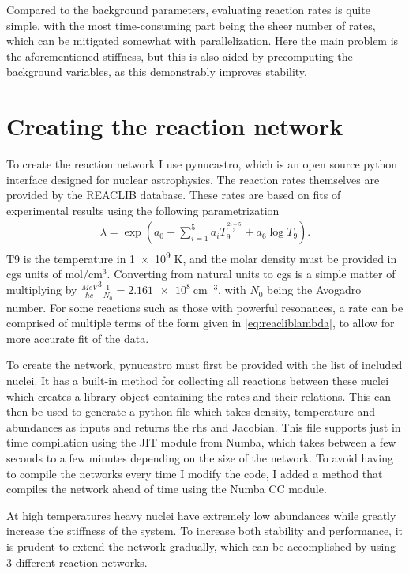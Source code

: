 Compared to the background parameters, evaluating reaction rates is quite simple, with the most time-consuming part being the sheer number of rates, which can be mitigated somewhat with parallelization. Here the main problem is the aforementioned stiffness, but this is also aided by precomputing the background variables, as this demonstrably improves stability. 




\section{Creating the reaction network}
\label{sec:pna}
To create the reaction network I use pynucastro\cite{pynucastro2}, which is an open source python interface designed for nuclear astrophysics. The reaction rates themselves are provided by the REACLIB database\cite{REACLIB}. These rates are based on fits of experimental results using the following parametrization 
\begin{align}
    \lambda = \exp\left(a_0+\sum_{i=1}^{5}a_i T_9^{\frac{2i-5}{3}}+a_6 \log{T_9}\right).
    \label{eq:reacliblambda}
\end{align}
T9 is the temperature in \num{1e9} K, and the molar density must be provided in cgs units of $\text{mol}/\text{cm}^3$. Converting from natural units to cgs is a simple matter of multiplying by $\frac{MeV}{\hbar c}^3\frac{1}{N_0}=\SI{2.161e8}{\cm^{-3}}$, with $N_0$ being the Avogadro number. For some reactions such as those with powerful resonances, a rate can be comprised of multiple terms of the form given in \eqref{eq:reacliblambda}, to allow for more accurate fit of the data. 

To create the network, pynucastro must first be provided with the list of included nuclei. It has a built-in method for collecting all reactions between these nuclei which creates a library object containing the rates and their relations. This can then be used to generate a python file which takes density, temperature and abundances as inputs and returns the rhs and Jacobian. This file supports just in time compilation using the JIT module from Numba, which takes between a few seconds to a few minutes depending on the size of the network. To avoid having to compile the networks every time I modify the code, I added a method that compiles the network ahead of time using the Numba CC module. 

At high temperatures heavy nuclei have extremely low abundances while greatly increase the stiffness of the system. To increase both stability and performance, it is prudent to extend the network gradually, which can be accomplished by using 3 different reaction networks. 

